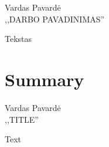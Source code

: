 \documentclass[a4paper, 12pt]{article} %
\newcommand{\studentas}{Vardas Pavard\.{e}} %
\newcommand{\pavadinimas}{Darbo pavadinimas} %
\begin{document}

\begin{onehalfspacing}

\begin{center}

\studentas \\[12pt]

\MakeUppercase{,,\pavadinimas''}\\

\end{center}

Tekstas

\newpage

\section*{Summary}


\begin{center}

\studentas \\[12pt]

\MakeUppercase{,,Title''}\\


\end{center}

Text

\end{onehalfspacing}
\end{document}
